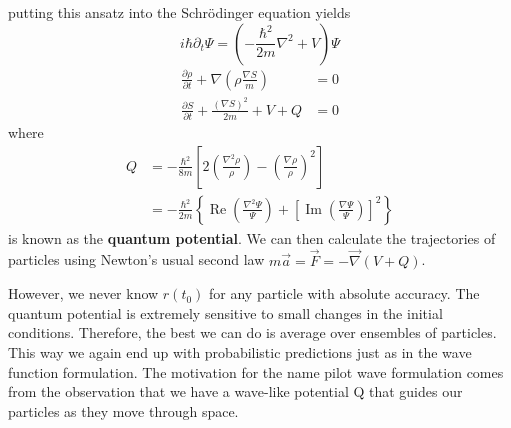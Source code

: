 putting this ansatz into the Schrödinger equation yields
$$
i \hbar \partial_{t} \Psi=\left(-\frac{\hbar^{2}}{2 m} \nabla^{2}+V\right) \Psi
$$
$$
\begin{aligned}
\frac{\partial \rho}{\partial t}+\nabla\left(\rho \frac{\nabla S}{m}\right) &=0 \\
\frac{\partial S}{\partial t}+\frac{(\nabla S)^{2}}{2 m}+V+Q &=0
\end{aligned}
$$
where
\begin{equation}
\begin{aligned}
Q &=-\frac{\hbar^{2}}{8 m}\left[2\left(\frac{\nabla^{2} \rho}{\rho}\right)-\left(\frac{\nabla \rho}{\rho}\right)^{2}\right] \\
&=-\frac{\hbar^{2}}{2 m}\left\{\operatorname{Re}\left(\frac{\nabla^{2} \Psi}{\Psi}\right)+\left[\operatorname{Im}\left(\frac{\nabla \Psi}{\Psi}\right)\right]^{2}\right\}
\end{aligned}
\end{equation}
is known as the \textbf{quantum potential}. We can then calculate
the trajectories of particles using Newton’s usual second law $m \vec{a}=\vec{F}=-\vec{\nabla}(V+Q)$.

However, we never know $r\left(t_{0}\right)$ for any particle with absolute accuracy. The quantum potential is extremely sensitive to small changes in the initial conditions. Therefore, the best we can do is average over ensembles of particles. This way we again end up with probabilistic predictions just as in the wave function formulation. The motivation for the name pilot wave formulation comes from the observation that we have a wave-like potential Q that guides our particles as they move through space.

